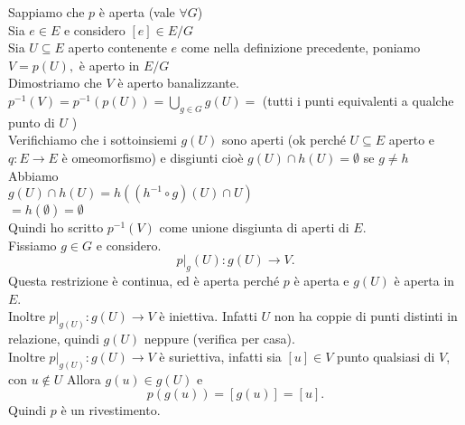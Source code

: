 \documentclass[12px]{article}
\begin{document}
		  \begin{dimo}
		  	Sappiamo che $p$ è aperta (vale $\forall G$)\\
			Sia  $e\in E$ e considero  $[e]\in E/G$\\
			Sia  $U\subseteq E$ aperto contenente $e$ come nella definizione precedente, poniamo $V = p(U),$ è aperto in  $E/G$\\
			Dimostriamo che $V$ è aperto banalizzante.\\
			$p^{-1}(V) = p^{-1}(p(U)) = \bigcup^{}_{g\in G}g(U)= $ (tutti i punti equivalenti a qualche punto di $U$ )\\
Verifichiamo che i sottoinsiemi $g(U)$ sono aperti (ok perché $U\subseteq E$ aperto e $q:E \rightarrow E$ è omeomorfismo) e disgiunti cioè  $g(U)\cap h(U) = \emptyset $ se  $g\neq h$\\
Abbiamo\\
$g(U)\cap h(U) = h((h^{-1}\circ g)(U)\cap U)$\\
$= h(\emptyset) = \emptyset$\\
Quindi ho scritto  $p^{-1}(V)$ come unione disgiunta di aperti di $E$.\\
Fissiamo $g\in G$ e considero.
 \[
p|_g(U): g(U) \rightarrow V
.\] 
Questa restrizione è continua, ed è aperta perché $p$ è aperta e $g(U)$ è aperta in $E$.\\
Inoltre  $p|_{g(U)}: g(U) \rightarrow V$ è iniettiva. Infatti $U$ non ha coppie di punti distinti in relazione, quindi $g(U)$ neppure (verifica per casa).\\
Inoltre $p|_{g(U)}: g(U) \rightarrow V$ è suriettiva, infatti sia $[u]\in V$ punto qualsiasi di  $V$, con $u\not\in U$ Allora  $g(u)\in g(U)$ e
 \[
	 p(g(u)) = [g(u)] = [u]
.\] 
Quindi $p$ è un rivestimento.
		  \end{dimo}
\end{document}

